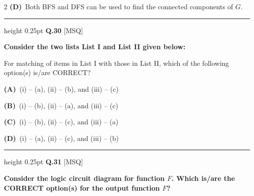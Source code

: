\documentclass[a4paper,10pt,twoside]{article}
\begin{document}
\begin{multicols}{2}
\textbf{(D)}~Both BFS and DFS can be used to find the connected components of $G$.
\par\vspace{6pt}\hrule height 0.25pt\vspace{6pt}
\noindent\textbf{Q.30} \hfill {\footnotesize\textsf{[MSQ]}}
\par\vspace{2pt}
{\bfseries Consider the two lists List I and List II given below:
\par\smallskip
\begin{center}\footnotesize
{}\end{center}
\par\smallskip
For matching of items in List I with those in List II, which of the following option(s) is/are CORRECT? \par}
\par\vspace{2pt}\noindent
\textbf{(A)}~(i) -- (a), (ii) -- (b), and (iii) -- (c)\par\vspace{2pt}\noindent
\textbf{(B)}~(i) -- (b), (ii) -- (a), and (iii) -- (c)\par\vspace{2pt}\noindent
\textbf{(C)}~(i) -- (b), (ii) -- (c), and (iii) -- (a)\par\vspace{2pt}\noindent
\textbf{(D)}~(i) -- (a), (ii) -- (c), and (iii) -- (b)
\par\vspace{6pt}\hrule height 0.25pt\vspace{6pt}
\noindent\textbf{Q.31} \hfill {\footnotesize\textsf{[MSQ]}}
\par\vspace{2pt}
{\bfseries Consider the logic circuit diagram for function $F$. Which is/are the CORRECT option(s) for the output function $F$? \par}
\par\vspace{2pt}\noindent

\end{multicols}
\end{document}
